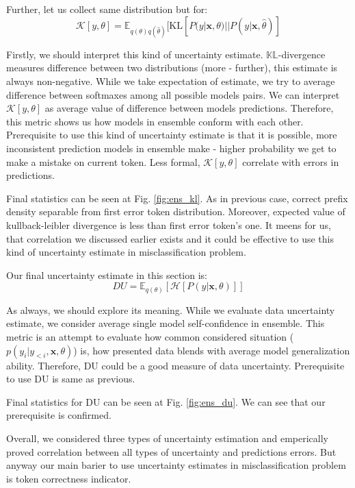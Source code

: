\documentclass[a4paper,14pt]{extarticle}
\begin{document}
	Further, let us collect same distribution but for:
	\begin{equation*}
		\mathcal{K}[y, \theta] = \mathbb{E}_{q(\theta)q(\hat{\theta})}[
			\mathrm{KL}[P(y|\textbf{x}, \theta) || P(y|\textbf{x}, \hat{\theta})
		]
	\end{equation*}
	
	Firstly, we should interpret this kind of uncertainty estimate. $\mathbb{KL}$-divergence measures difference between two distributions (more - further), this estimate is always non-negative. While we take expectation of estimate, we try to average difference between softmaxes among all possible models pairs. We can interpret $\mathcal{K}[y, \theta]$ as average value of difference between models predictions. Therefore, this metric shows us how models in ensemble conform with each other. Prerequisite to use this kind of uncertainty estimate is that it is possible, more inconsistent prediction models in ensemble make - higher probability we get to make a mistake on current token. Less formal, $\mathcal{K}[y, \theta]$ correlate with errors in predictions.
	
	Final statistics can be seen at Fig. \ref{fig:ens_kl}. As in previous case, correct prefix density separable from first error token distribution. Moreover, expected value of kullback-leibler divergence is less than first error token's one. It meens for us, that correlation we discussed earlier exists and it could be effective to use this kind of uncertainty estimate in misclassification problem. 
	
	Our final uncertainty estimate in this section is:
	\begin{equation*}
		DU = \mathbb{E}_{q(\theta)}[\mathcal{H}[P(y| \textbf{x}, \theta)]]
	\end{equation*}
	
	As always, we should explore its meaning. While we evaluate data uncertainty estimate, we consider average single model self-confidence in ensemble. This metric is an attempt to evaluate how common considered situation ($p(y_i | y_{<i}, \textbf{x}, \theta)$) is, how presented data blends with average model generalization ability. Therefore, DU could be a good measure of data uncertainty. Prerequisite to use DU is same as previous.
	
	Final statistics for DU can be seen at Fig. \ref{fig:ens_du}. We can see that our prerequisite is confirmed.
	
	Overall, we considered three types of uncertainty estimation and emperically proved correlation between all types of uncertainty and predictions errors. But anyway our main barier to use uncertainty estimates in misclassification problem is token correctness indicator.
	
\end{document}
